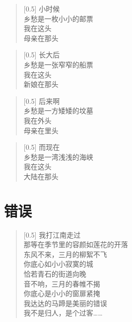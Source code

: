 \documentclass[12pt,UTF-8,openany]{ctexbook}
\begin{document}
\begin{normalsize}
    
    \begin{verse}[0.5\linewidth]
        小时候 \\
        乡愁是一枚小小的邮票 \\
        我在这头 \\
        母亲在那头
    \end{verse}
    
    
    \begin{verse}[0.5\linewidth]
        长大后 \\
        乡愁是一张窄窄的船票 \\
        我在这头 \\
        新娘在那头
    \end{verse}
    
    
    \begin{verse}[0.5\linewidth]
        后来啊 \\
        乡愁是一方矮矮的坟墓 \\
        我在外头 \\
        母亲在里头
    \end{verse}
    
    
    \begin{verse}[0.5\linewidth]
        而现在 \\
        乡愁是一湾浅浅的海峡 \\
        我在这头 \\
        大陆在那头
    \end{verse}
    
\end{normalsize}



\chapter{错误}

\begin{normalsize}
    
    \begin{verse}[0.5\linewidth]
        我打江南走过 \\
        那等在季节里的容颜如莲花的开落 \\
        东风不来，三月的柳絮不飞 \\
        你底心如小小寂寞的城 \\
        恰若青石的街道向晚 \\
        音不响，三月的春帷不揭 \\
        你底心是小小的窗扉紧掩 \\
        我达达的马蹄是美丽的错误 \\
        我不是归人，是个过客……
    \end{verse}
    
\end{normalsize}
\end{document}
